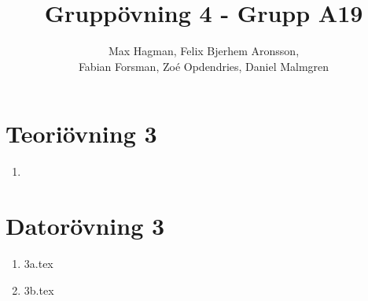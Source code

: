 \documentclass[a4paper]{report}
\title{Gruppövning 4 - Grupp A19}
\author{Max Hagman, Felix Bjerhem Aronsson,\\ Fabian Forsman, Zoé Opdendries, Daniel Malmgren}
\begin{document}
\maketitle

\section*{Teoriövning 3}
\begin{enumerate}[label=(\alph*)]
    \item
\end{enumerate}
\section*{Datorövning 3}
\begin{enumerate}[label=(\alph*)]
    \item {3a.tex}
    \item {3b.tex}
\end{enumerate}
\end{document}
